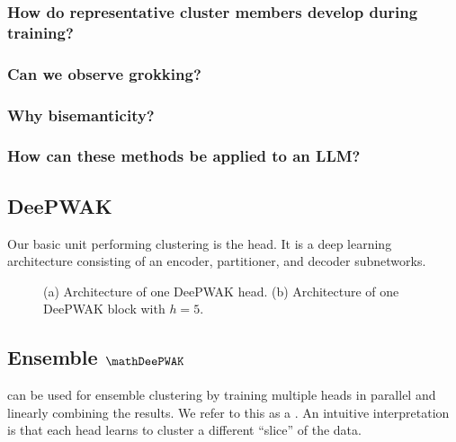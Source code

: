 \subsubsection{How do representative cluster members develop during training?}

\subsubsection{Can we observe grokking?}

\subsubsection{Why bisemanticity?}

\subsubsection{How can these methods be applied to an LLM?}
\subsection{DeePWAK}

Our basic unit performing clustering is the \DeePWAK head.
It is a deep learning architecture consisting of an encoder, partitioner, and decoder subnetworks.


\begin{figure}
     \begin{subfigure}[b]{0.5\textwidth}
        
         \caption{}
         \label{fig:}
     \end{subfigure}
     \hfill
     \begin{subfigure}[b]{\textwidth}
        
         \caption{}
         \label{fig:}
     \end{subfigure}

     \caption{
       (a) Architecture of one DeePWAK head.
       (b) Architecture of one DeePWAK block with $h=5$.}
     \label{fig:deepwak}
\end{figure}
  
\subsection{Ensemble $\mathDeePWAK$}

\DeePWAK can be used for ensemble clustering by training multiple heads in parallel and linearly combining the results.
We refer to this as a \DeePWAKBlock.
An intuitive interpretation is that each head learns to cluster a different ``slice'' of the data.

